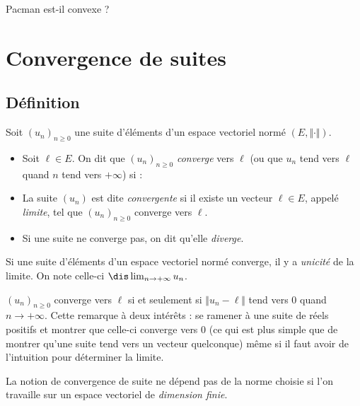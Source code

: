 \documentclass[a4paper,10pt]{report}
\begin{document}
\begin{exa} Pacman est-il convexe ?
\end{exa} 

\section{Convergence de suites}
\subsection{Définition}
\begin{defin} Soit $(u_n)_{n \geq 0}$ une suite d'éléments d'un espace vectoriel normé $(E, \Vert \cdot \Vert)$.

\begin{itemize}
\item Soit $\ell \in E$. On dit que $(u_n)_{ n\geq 0}$ \textit{converge} vers $\ell$ (ou que $u_n$ tend vers $\ell$ quand $n$ tend vers $+ \infty$) si :

\vspace{1cm}

\item La suite $(u_n)$ est dite \textit{convergente} si il existe un vecteur $\ell \in E$, appelé \textit{limite}, tel que $(u_n)_{n \geq 0}$ converge vers $\ell$.
\item Si une suite ne converge pas, on dit qu'elle \textit{diverge}.
\end{itemize}
\end{defin}

\begin{thm} Si une suite d'éléments d'un espace vectoriel normé converge, il y a \textit{unicité} de la limite. On note celle-ci $\dis \lim_{n \rightarrow + \infty} u_n$.
\end{thm}

\begin{rem} $(u_n)_{n \geq 0}$ converge vers $\ell$ si et seulement si $\Vert u_n - \ell \Vert$ tend vers $0$ quand $n \rightarrow + \infty$.  Cette remarque à deux intérêts : se ramener à une suite de réels positifs et montrer que celle-ci converge vers $0$ (ce qui est plus simple que de montrer qu'une suite tend vers un vecteur quelconque) même si il faut avoir de l'intuition pour déterminer la limite.
\end{rem}

\begin{thm} La notion de convergence de suite ne dépend pas de la norme choisie si l'on travaille sur un espace vectoriel de \textit{dimension finie}.
\end{thm}
\end{document}
